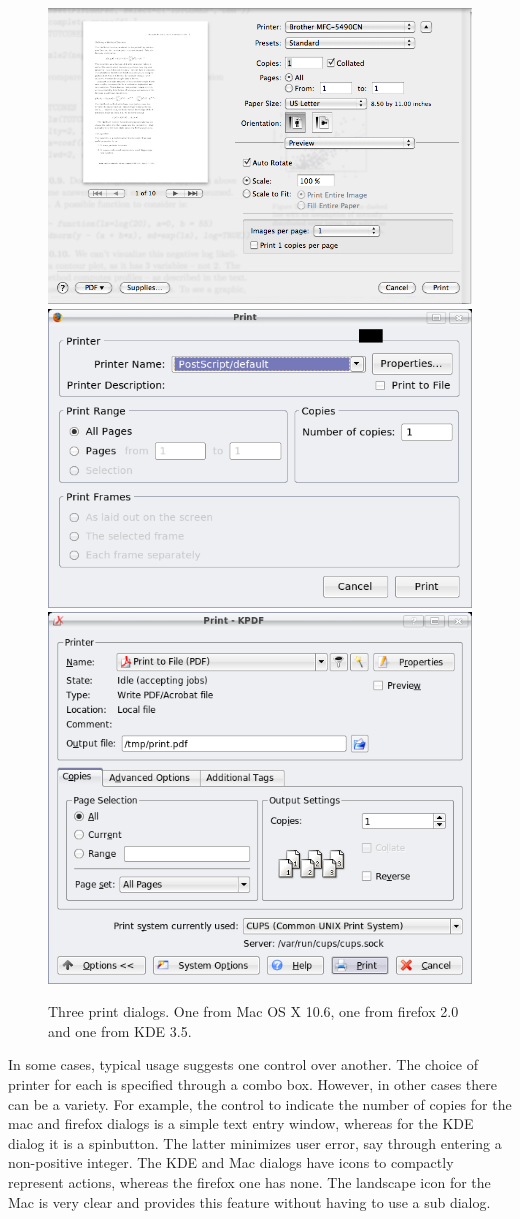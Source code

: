 
\begin{figure}
  \centering
  \includegraphics[width=.60\textwidth]{fig-mac-print}
  \\
  \includegraphics[width=.60\textwidth]{firefox-print}
  \\
  \includegraphics[width=.60\textwidth]{kde-print}
  \caption{Three print dialogs. One from Mac OS X 10.6, one from
    firefox 2.0 and one from KDE 3.5.}
  \label{fig:GUI:print-dialogs}
\end{figure}

In some cases, typical usage suggests one control over another. The
choice of printer for each is specified through a combo box. However,
in other cases there can be a variety. For example, the control to indicate the
number of copies for the mac and firefox dialogs is a simple text
entry window, whereas for the KDE dialog it is a spinbutton. The
latter minimizes user error, say through entering a non-positive
integer. The KDE and Mac dialogs have icons to compactly represent
actions, whereas the firefox one has none. The landscape icon for the
Mac is very clear and provides this feature without having to use a
sub dialog.


